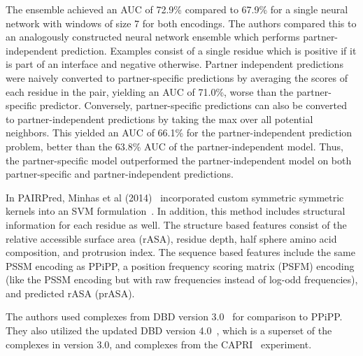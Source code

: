 The ensemble achieved an AUC of 72.9\% compared to 67.9\% for a single neural network with windows of size 7 for both encodings.
The authors compared this to an analogously constructed neural network ensemble which performs partner-independent prediction.
Examples consist of a single residue which is positive if it is part of an interface and negative otherwise.
Partner independent predictions were naively converted to partner-specific predictions by averaging the scores of each residue in the pair, yielding an AUC of 71.0\%, worse than the partner-specific predictor.
Conversely, partner-specific predictions can also be converted to partner-independent predictions by taking the max over all potential neighbors. 
This yielded an AUC of 66.1\% for the partner-independent prediction problem, better than the 63.8\% AUC of the partner-independent model.
Thus, the partner-specific model outperformed the partner-independent model on both partner-specific and partner-independent predictions.

In PAIRPred, Minhas et al (2014)~\cite{minhas2014} incorporated custom symmetric symmetric kernels into an SVM formulation~\cite{minhas2014}.
In addition, this method includes structural information for each residue as well.
The structure based features consist of the relative accessible surface area (rASA), residue depth, half sphere amino acid composition, and protrusion index.
The sequence based features include the same PSSM encoding as PPiPP, a position frequency scoring matrix (PSFM) encoding (like the PSSM encoding but with raw frequencies instead of log-odd frequencies), and predicted rASA (prASA).

The authors used complexes from DBD version 3.0~\cite{hwang2008} for comparison to PPiPP.
They also utilized the updated DBD version 4.0~\cite{hwang2010}, which is a superset of the complexes in version 3.0, and complexes from the CAPRI~\cite{janin2013} experiment.


